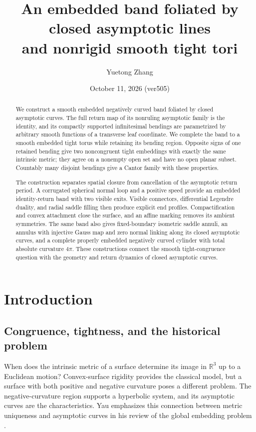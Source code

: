 \documentclass[11pt]{amsart}
\title[Closed asymptotic bands and tight tori]{An embedded band foliated by closed asymptotic lines\\and nonrigid smooth tight tori}
\author{Yuetong Zhang}
\date{October 11, 2026 (ver505)}
\theoremstyle{definition}
\theoremstyle{remark}
\newcommand{\R}{\mathbb R}\newcommand{\Sph}{\mathbb S}
\numberwithin{equation}{section}
\begin{document}
\begin{abstract}
We construct a smooth embedded negatively curved band foliated by closed
asymptotic curves. The full return map of its nonruling asymptotic family
is the identity, and its compactly supported infinitesimal bendings are
parametrized by arbitrary smooth functions of a transverse leaf coordinate.
We complete the band to a smooth embedded tight torus while retaining
its bending region. Opposite signs of one retained bending give two
noncongruent tight embeddings with exactly the same intrinsic metric;
they agree on a nonempty open set and have no open planar subset.
Countably many disjoint bendings give a Cantor family with these properties.

The construction separates spatial closure from cancellation of the
asymptotic return period. A corrugated spherical normal loop and a
positive speed provide an embedded identity-return band with two visible
exits. Visible connectors, differential Legendre duality, and radial
saddle filling then produce explicit end profiles. Compactification and
convex attachment close the surface, and an affine marking removes its
ambient symmetries. The same band also gives fixed-boundary isometric
saddle annuli, an annulus with injective Gauss map and zero normal
linking along its closed asymptotic curves, and a complete properly
embedded negatively curved cylinder with total absolute curvature $4\pi$.
These constructions connect the smooth tight-congruence question with
the geometry and return dynamics of closed asymptotic curves.
\end{abstract}
\maketitle

\section{Introduction}\label{sec:intro}
\subsection{Congruence, tightness, and the historical problem}
When does the intrinsic metric of a surface determine its image in
$\R^3$ up to a Euclidean motion? Convex-surface rigidity provides the
classical model, but a surface with both positive and negative curvature
poses a different problem. The negative-curvature region supports a
hyperbolic system, and its asymptotic curves are the characteristics.
Yau emphasizes this connection between metric uniqueness and asymptotic
curves in his review of the global embedding problem
\cite[pp.~235--236]{YauReview}.
\end{document}
